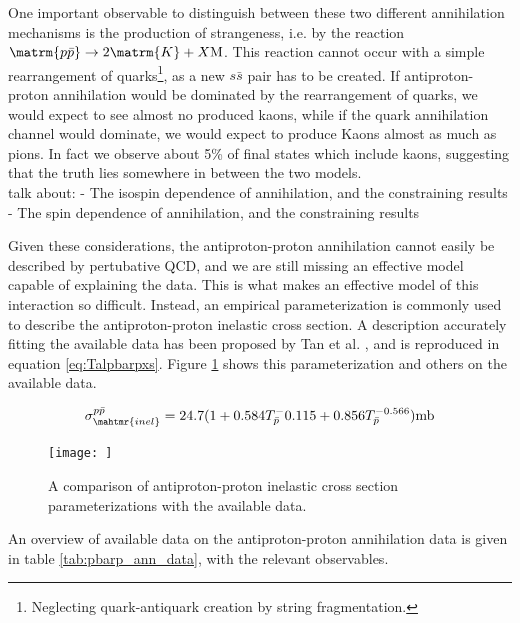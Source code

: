 One important observable to distinguish between these two different annihilation mechanisms is the production of strangeness, i.e. by the reaction $\matrm{p\bar{p}} \rightarrow 2\matrm{K}+ X\mathrm{M}$. This reaction cannot occur with a simple rearrangement of quarks\footnote{Neglecting quark-antiquark creation by string fragmentation.}, as a new $s\bar{s}$ pair has to be created. If antiproton-proton annihilation would be dominated by the rearrangement of quarks, we would expect to see almost no produced kaons, while if the quark annihilation channel would dominate, we would expect to produce Kaons almost as much as pions. In fact we observe about 5\% of final states which include kaons, suggesting that the truth lies somewhere in between the two models. \\

talk about:
- The isospin dependence of annihilation, and the constraining results
- The spin dependence of annihilation, and the constraining results

Given these considerations, the antiproton-proton annihilation cannot easily be described by pertubative QCD, and we are still missing an effective model capable of explaining the data. This is what makes an effective model of this interaction so difficult. Instead, an empirical parameterization is commonly used to describe the antiproton-proton inelastic cross section. A description accurately fitting the available data has been proposed by Tan et al. \cite{Tan_1983}, and is reproduced in equation \ref{eq:Talpbarpxs}. Figure \ref{fig:pbar_p_xs_data_comp} shows this parameterization and others on the available data.  

\begin{equation}\label{eq:Talpbarpxs}
    \sigma_\mahtmr{inel}^{p\bar{p}} = 24.7 (1 + 0.584T_{\bar{p}}^-0.115 + 0.856 T_{\bar{p}}^{-0.566}) \mathrm{mb}
\end{equation}

\begin{figure}[h!]
    \centering
    \texttt{[image: ]}
    \caption{A comparison of antiproton-proton inelastic cross section parameterizations with the available data.}
    \label{fig:pbar_p_xs_data_comp}
\end{figure}
An overview of available data on the antiproton-proton annihilation data is given in table \ref{tab:pbarp_ann_data}, with the relevant observables. 


